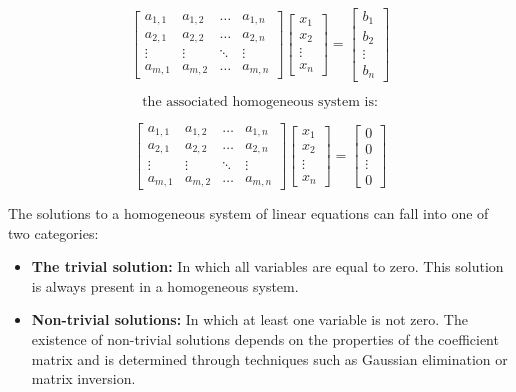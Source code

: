 \[
\begin{bmatrix}
    a_{1,1} & a_{1,2} & \ldots & a_{1,n} \\
    a_{2,1} & a_{2,2} & \ldots & a_{2,n} \\
    \vdots & \vdots & \ddots & \vdots \\
    a_{m,1} & a_{m,2} & \ldots & a_{m,n}
\end{bmatrix}
\begin{bmatrix}
    x_1 \\
    x_2 \\
    \vdots \\
    x_n
\end{bmatrix}
=
\begin{bmatrix}
    b_1 \\
    b_2 \\
    \vdots \\
    b_n
\end{bmatrix}
\]

\[
\text{the associated homogeneous system is:}
\]

\[
\begin{bmatrix}
    a_{1,1} & a_{1,2} & \ldots & a_{1,n} \\
    a_{2,1} & a_{2,2} & \ldots & a_{2,n} \\
    \vdots & \vdots & \ddots & \vdots \\
    a_{m,1} & a_{m,2} & \ldots & a_{m,n}
\end{bmatrix}
\begin{bmatrix}
    x_1 \\
    x_2 \\
    \vdots \\
    x_n
\end{bmatrix}
=
\begin{bmatrix}
    0 \\
    0 \\
    \vdots \\
    0
\end{bmatrix}
\]

The solutions to a homogeneous system of linear equations can fall into one of two categories:

\begin{itemize}
    \item \textbf{The trivial solution:} In which all variables are equal to zero. This solution is always present in a homogeneous system.
    \item \textbf{Non-trivial solutions:} In which at least one variable is not zero. The existence of non-trivial solutions depends on the properties of the coefficient matrix and is determined through techniques such as Gaussian elimination or matrix inversion.
\end{itemize}

